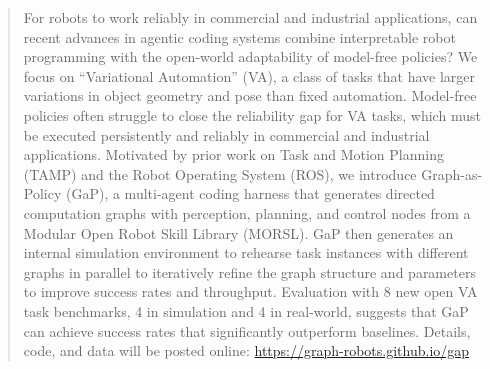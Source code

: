 \documentclass{article}
\begin{document}
\begin{abstract}
    For robots to work reliably in commercial and industrial applications, can recent advances in agentic coding systems combine interpretable robot programming with the open-world adaptability of model-free policies?  We focus on ``Variational Automation'' (VA), a class of tasks that have larger variations in object geometry and pose than fixed automation.  Model-free policies often struggle to close the reliability gap for VA tasks, which must be executed persistently and reliably in commercial and industrial applications. Motivated by prior work on Task and Motion Planning (TAMP) and the Robot Operating System (ROS), we introduce Graph-as-Policy (GaP), a multi-agent coding harness that generates directed computation graphs with perception, planning, and control nodes from a Modular Open Robot Skill Library (MORSL).
    GaP then generates an internal simulation environment to rehearse task instances with different graphs in parallel to iteratively refine the graph structure and parameters to improve success rates and throughput.   Evaluation with 8 new open VA task benchmarks, 4 in simulation and 4 in real-world, suggests that GaP can achieve success rates that significantly outperform baselines. Details, code, and data will be posted online: \url{https://graph-robots.github.io/gap}
\end{abstract}








\appendix

\end{document}
